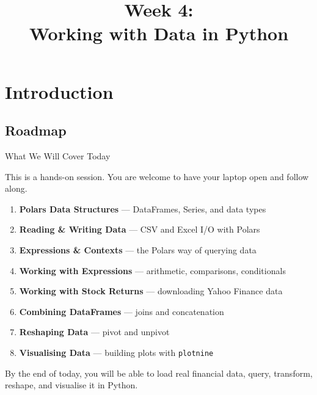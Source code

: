 \documentclass[9pt,aspectratio=169]{beamer}
\title{\LARGE \textnormal{Week 4: \\
Working with Data in Python}}
\begin{document}
\begin{frame}[plain]
\titlepage
\end{frame}


\section{Introduction}
\subsection{Roadmap}

\begin{frame}{What We Will Cover Today}

This is a \alert{hands-on session}. You are welcome to have your laptop open and follow along.

\medskip

\begin{enumerate}
    \item \textbf{Polars Data Structures} --- DataFrames, Series, and data types
    \item \textbf{Reading \& Writing Data} --- CSV and Excel I/O with Polars
    \item \textbf{Expressions \& Contexts} --- the Polars way of querying data
    \item \textbf{Working with Expressions} --- arithmetic, comparisons, conditionals
    \item \textbf{Working with Stock Returns} --- downloading Yahoo Finance data
    \item \textbf{Combining DataFrames} --- joins and concatenation
    \item \textbf{Reshaping Data} --- pivot and unpivot
    \item \textbf{Visualising Data} --- building plots with \texttt{plotnine}
\end{enumerate}

\medskip

\begin{highlightbox}
\centering
By the end of today, you will be able to load real financial data, query, transform, reshape, and visualise it in Python.
\end{highlightbox}

\end{frame}
\end{document}
